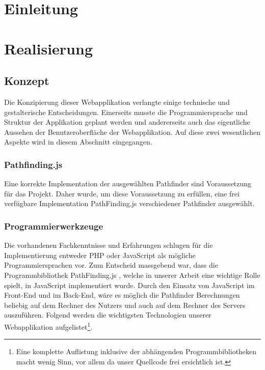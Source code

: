 \documentclass[12pt,a4paper,german]{report}
\begin{document}




\tableofcontents{}


\chapter{Einleitung}

\chapter{Realisierung}
\section{Konzept}
Die Konzipierung dieser Webapplikation verlangte einige technische und gestalterische Entscheidungen. 
Einerseits musste die Programmiersprache und Struktur der Applikation geplant werden und andererseits auch das eigentliche Aussehen der Benutzeroberfläche der Webapplikation. 
Auf diese zwei wesentlichen Aspekte wird in diesem Abschnitt eingegangen.
\subsection{Pathfinding.js}
Eine korrekte Implementation der ausgewählten Pathfinder sind Voraussetzung für das Projekt. 
Daher wurde, um diese Voraussetzung zu erfüllen, eine frei verfügbare Implementation PathFinding.js \cite{pfjs} verschiedener Pathfinder ausgewählt.
\subsection{Programmierwerkzeuge}
Die vorhandenen Fachkenntnisse und Erfahrungen schlugen für die Implementierung entweder PHP oder JavaScript als mögliche Programmiersprachen vor. 
Zum Entscheid massgebend war, dass die Programmbibliothek PathFinding.js \cite{pfjs}, welche in unserer Arbeit eine wichtige Rolle spielt, in JavaScript implementiert wurde. 
Durch den Einsatz von JavaScript im Front-End und im Back-End, wäre es möglich die Pathfinder Berechnungen beliebig auf dem Rechner des Nutzers und auch auf dem Rechner des Servers auszuführen. 
Folgend werden die wichtigsten Technologien unserer Webapplikation aufgelistet\footnote{Eine komplette Auflistung inklusive der abhängenden Programmbibliotheken macht wenig Sinn, vor allem da unser Quellcode frei ersichtlich ist.}.
\end{document}
